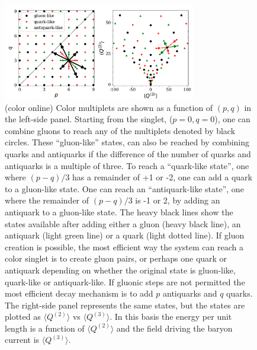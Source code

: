 \documentclass[aps, prc, 12pt, nofootinbib, showpacs, superscriptaddress, tightenlines, groupedaddress]{revtex4-2}
\begin{document}
\begin{figure}
\centerline{\includegraphics[width=0.75\textwidth]{figs/pq3.pdf}}
\caption{\label{fig:pq3}(color online)
Color multiplets are shown as a function of $(p,q)$ in the left-side panel. Starting from the singlet, ($p=0,q=0$), one can combine gluons to reach any of the multiplets denoted by black circles. These ``gluon-like'' states,  can also be reached by combining quarks and antiquarks if the difference of the number of quarks and antiquarks is a multiple of three. To reach a ``quark-like state'', one where $(p-q)/3$ has a remainder of +1 or -2, one can add a quark to a gluon-like state. One can reach an ``antiquark-like state'', one where the remainder of $(p-q)/3$ is -1 or 2, by adding an antiquark to a gluon-like state. The heavy black lines show the states available after adding either a gluon (heavy black line), an antiquark (light green line) or a quark (light dotted line). If gluon creation is possible, the most efficient way the system can reach a color singlet is to create gluon pairs, or perhaps one quark or antiquark depending on whether the original state is gluon-like, quark-like or antiquark-like. If gluonic steps are not permitted the most efficient decay mechanism is to add $p$ antiquarks and $q$ quarks. The right-side panel represents the same states, but the states are plotted as $\langle Q^{(2)}\rangle$ vs $\langle Q^{(3)}\rangle$. In this basis the energy per unit length is a function of $\langle Q^{(2)}\rangle$ and the field driving the baryon current is $\langle Q^{(3)}\rangle$.}
\end{figure}
\end{document}
